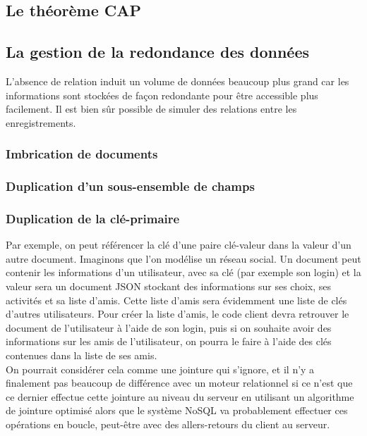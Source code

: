 \subsection{Le théorème CAP}
\subsection{La gestion de la redondance des données}
	L'absence de relation induit un volume de données beaucoup plus grand car les informations sont stockées de façon redondante pour être accessible plus facilement. Il est bien sûr possible de simuler des relations entre les enregistrements.

	\subsubsection{Imbrication de documents}
	\subsubsection{Duplication d'un sous-ensemble de champs}
	\subsubsection{Duplication de la clé-primaire}
		Par exemple, on peut référencer la clé d'une paire clé-valeur dans la valeur d'un autre document. Imaginons que l'on modélise un réseau social. Un document peut contenir les informations d'un utilisateur, avec sa clé (par exemple son login) et la valeur sera un document JSON stockant des informations sur ses choix, ses activités et sa liste d'amis. Cette liste d'amis sera évidemment une liste de clés d'autres utilisateurs. Pour créer la liste d'amis, le code client devra retrouver le document de l'utilisateur à l'aide de son login, puis si on souhaite avoir des informations sur les amis de l'utilisateur, on pourra le faire à l'aide des clés contenues dans la liste de ses amis.\\

		On pourrait considérer cela comme une jointure qui s'ignore, et il n'y a finalement pas beaucoup de différence avec un moteur relationnel si ce n'est que ce dernier effectue cette jointure au niveau du serveur en utilisant un algorithme de jointure optimisé alors que le système NoSQL va probablement effectuer ces opérations en boucle, peut-être avec des allers-retours du client au serveur.

